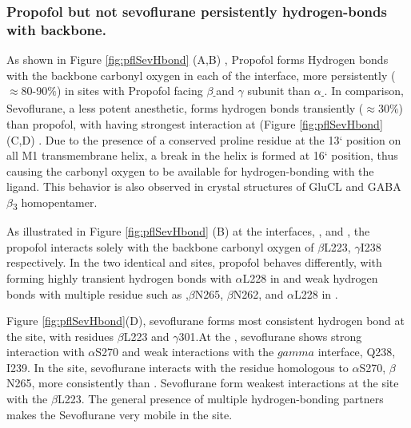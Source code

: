 \documentclass{biophys}
\begin{document}
\subsubsection{Propofol but not sevoflurane persistently hydrogen-bonds with backbone.}

As shown in Figure \ref{fig:pflSevHbond} (A,B) , Propofol forms Hydrogen bonds with the backbone carbonyl oxygen in each of the interface, more persistently ($\approx$80-90$\%$) in sites with Propofol facing $\beta$\textsubscript{-}and $\gamma$ subunit than  $\alpha$\textsubscript{-}. In comparison, Sevoflurane, a less potent anesthetic,  forms hydrogen bonds transiently ($\approx$30$\%$) than propofol, with having strongest interaction at \gb \gba (Figure \ref{fig:pflSevHbond} (C,D) . 
Due to the presence of a conserved proline residue at the 13` position on all M1 transmembrane helix,  a break in the helix is formed at 16` position, thus causing the carbonyl oxygen to be available for hydrogen-bonding with the ligand. This behavior  is also observed in crystal structures of GluCL and GABA $\beta$\textsubscript{3} homopentamer.

As illustrated in Figure \ref{fig:pflSevHbond} (B)  at the interfaces, \gb, \ab and \ag, the propofol interacts solely with the backbone carbonyl oxygen of $\beta$L223, $\gamma$I238 respectively. In the two identical \bag and \gba sites, propofol behaves differently, with forming highly transient hydrogen bonds with $\alpha$L228 in  \gba and weak hydrogen bonds with multiple residue such as ,$\beta$N265, $\beta$N262, and $\alpha$L228 in \bag.

Figure \ref{fig:pflSevHbond}(D), sevoflurane forms most consistent hydrogen bond at the \gb site, with residues $\beta$L223 and $\gamma$301.At the \ag, sevoflurane shows strong interaction with $\alpha$S270 and weak interactions with the $gamma$ interface, Q238, I239. In the \gba site, sevoflurane interacts with the residue homologous to $\alpha$S270, $\beta$N265, more consistently  than \bag. Sevoflurane form weakest interactions at the \ab site with the $\beta$L223. The general presence of multiple hydrogen-bonding partners makes the Sevoflurane very mobile in the site.

\end{document}
